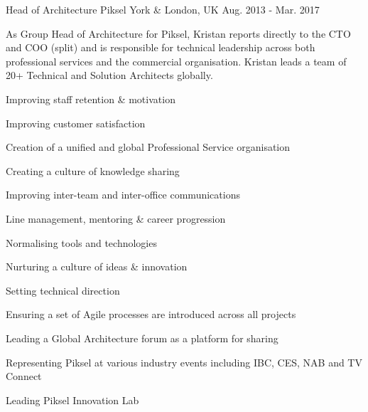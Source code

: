 \begin{cventries}

\cvexpentry
{Head of Architecture} %
{Piksel} %
{York \& London, UK} %
{Aug. 2013 - Mar. 2017} %
{
\begin{cvitemstitle}
\item {As Group Head of Architecture for Piksel, Kristan reports directly to the CTO and COO (split) and is responsible for technical leadership across both professional services and the commercial organisation. Kristan leads a team of 20+ Technical and Solution Architects globally.}
\end{cvitemstitle}
}
{ %
\begin{cvitems}
\item {Improving staff retention \& motivation}
\item {Improving customer satisfaction}
\item {Creation of a unified and global Professional Service organisation}
\item {Creating a culture of knowledge sharing}
\item {Improving inter-team and inter-office communications}
\item {Line management, mentoring \& career progression}
\item {Normalising tools and technologies}
\item {Nurturing a culture of ideas \& innovation}
\item {Setting technical direction}
\item {Ensuring a set of Agile processes are introduced across all projects}
\item {Leading a Global Architecture forum as a platform for sharing}
\item {Representing Piksel at various industry events including IBC, CES, NAB and TV Connect}
\item {Leading Piksel Innovation Lab}
\end{cvitems}
}



\end{cventries}
